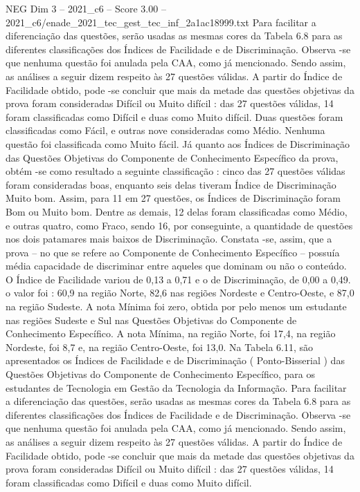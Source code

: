\begin{textsample}{NEG Dim 3 – 2021\_c6 – Score 3.00 – 2021\_c6/enade\_2021\_tec\_gest\_tec\_inf\_2a1ac18999.txt}
Para facilitar a diferenciação das questões, serão usadas as mesmas cores da Tabela 6.8 para as diferentes classificações dos Índices de Facilidade e de Discriminação.
Observa -se que nenhuma questão foi anulada pela CAA, como já mencionado.
Sendo assim, as análises a seguir dizem respeito às 27 questões válidas.
A partir do Índice de Facilidade obtido, pode -se concluir que mais da metade das questões objetivas da prova foram consideradas Difícil ou Muito difícil : das 27 questões válidas, 14 foram classificadas como Difícil e duas como Muito difícil.
Duas questões foram classificadas como Fácil, e outras nove consideradas como Médio.
Nenhuma questão foi classificada como Muito fácil.
Já quanto aos Índices de Discriminação das Questões Objetivas do Componente de Conhecimento Específico da prova, obtém -se como resultado a seguinte classificação : cinco das 27 questões válidas foram consideradas boas, enquanto seis delas tiveram Índice de Discriminação Muito bom.
Assim, para 11 em 27 questões, os Índices de Discriminação foram Bom ou Muito bom.
Dentre as demais, 12 delas foram classificadas como Médio, e outras quatro, como Fraco, sendo 16, por conseguinte, a quantidade de questões nos dois patamares mais baixos de Discriminação.
Constata -se, assim, que a prova – no que se refere ao Componente de Conhecimento Específico – possuía média capacidade de discriminar entre aqueles que dominam ou não o conteúdo.
O Índice de Facilidade variou de 0,13 a 0,71 e o de Discriminação, de 0,00 a 0,49. o valor foi : 60,9 na região Norte, 82,6 nas regiões Nordeste e Centro-Oeste, e 87,0 na região Sudeste.
A nota Mínima foi zero, obtida por pelo menos um estudante nas regiões Sudeste e Sul nas Questões Objetivas do Componente de Conhecimento Específico.
A nota Mínima, na região Norte, foi 17,4, na região Nordeste, foi 8,7 e, na região Centro-Oeste, foi 13,0.
Na Tabela 6.11, são apresentados os Índices de Facilidade e de Discriminação ( Ponto-Bisserial ) das Questões Objetivas do Componente de Conhecimento Específico, para os estudantes de Tecnologia em Gestão da Tecnologia da Informação.
Para facilitar a diferenciação das questões, serão usadas as mesmas cores da Tabela 6.8 para as diferentes classificações dos Índices de Facilidade e de Discriminação.
Observa -se que nenhuma questão foi anulada pela CAA, como já mencionado.
Sendo assim, as análises a seguir dizem respeito às 27 questões válidas.
A partir do Índice de Facilidade obtido, pode -se concluir que mais da metade das questões objetivas da prova foram consideradas Difícil ou Muito difícil : das 27 questões válidas, 14 foram classificadas como Difícil e duas como Muito difícil.

\end{textsample}
